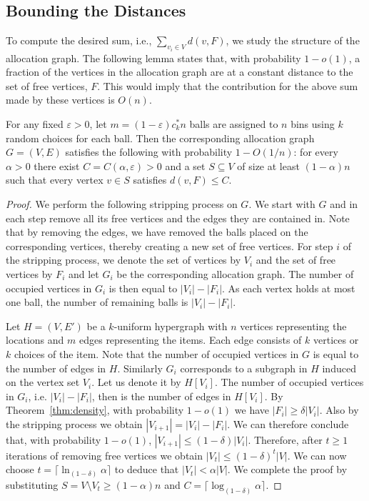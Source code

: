 \subsection{Bounding the Distances }
To compute the desired sum, i.e., $\sum_{v_i\in V}d(v,F)$, we study the structure of the allocation graph. The following lemma states that, with probability $1-o(1)$, a fraction of the vertices in the allocation graph are at a constant distance to the set of free vertices, $F$. This would imply that the contribution for the above sum made by these vertices is $O(n)$. 

\begin{lemma}\label{lem:dist}
For any fixed $\varepsilon>0$, let $m=(1-\varepsilon) c_k^* n$ balls are assigned to $n$ bins using $k$ random choices for each ball. Then the corresponding allocation graph $G=(V,E)$ satisfies the following with probability $1-O(1/n)$: for every $\alpha >0$ there exist $C=C(\alpha, \varepsilon) >0$ and a set $S \subseteq V$ of size at least $(1-\alpha)n$ such that every vertex $v\in S$ satisfies $d(v,F)\le C$. \end{lemma}

\begin{proof}
We perform the following stripping process on $G$.
We start with $G$ and in each step remove all its free vertices and the edges they are contained in. Note that by removing the edges, we have removed the balls placed on the corresponding vertices, thereby creating a new set of free vertices. For step $i$ of the stripping process, we denote the set of vertices by $V_i$ and the set of free vertices by $F_i$ and let $G_i$ be the corresponding allocation graph. The number of occupied vertices in $G_i$ is then equal to $|V_i|-|F_i|$. As each vertex holds at most one ball, the number of remaining balls is $|V_i|-|F_i|$.

Let $H=(V,E')$ be a $k$-uniform hypergraph with $n$ vertices representing the locations and $m$ edges representing the items. Each edge consists of $k$ vertices or $k$ choices of the item.
Note that the number of occupied vertices in $G$ is equal to the number of edges in $H$. Similarly $G_i$ corresponds to a subgraph in $H$ induced on the vertex set $V_i$. Let us denote it by $H[V_i]$. 
The number of occupied vertices in $G_i$, i.e. $|V_{i}|-|F_{i}|$, then is the number of edges in $H[V_i]$. By Theorem~\ref{thm:density}, with probability $1-o(1)$ we have $|F_{i}|\ge \delta |V_{i}|$.  Also by the stripping process we obtain $|V_{i+1}| = |V_{i}|- |F_{i}| $. We can therefore conclude that, with probability $1-o(1)$,  $|V_{i+1}| \le (1-\delta) |V_{i}|$.
Therefore, after $t\ge 1$ iterations of removing free vertices we obtain  $|V_{t}|\le (1-\delta )^{t}|V|$. We can now choose $t=\lceil{\ln_{(1-\delta)}\alpha}\rceil$ to deduce that $ |V_{t}| <\alpha |V|$. We complete the proof by substituting $S= V\setminus V_t \ge (1-\alpha) n$ and $C= \lceil{\log_{(1-\delta)} \alpha}\rceil$.
\end{proof}

